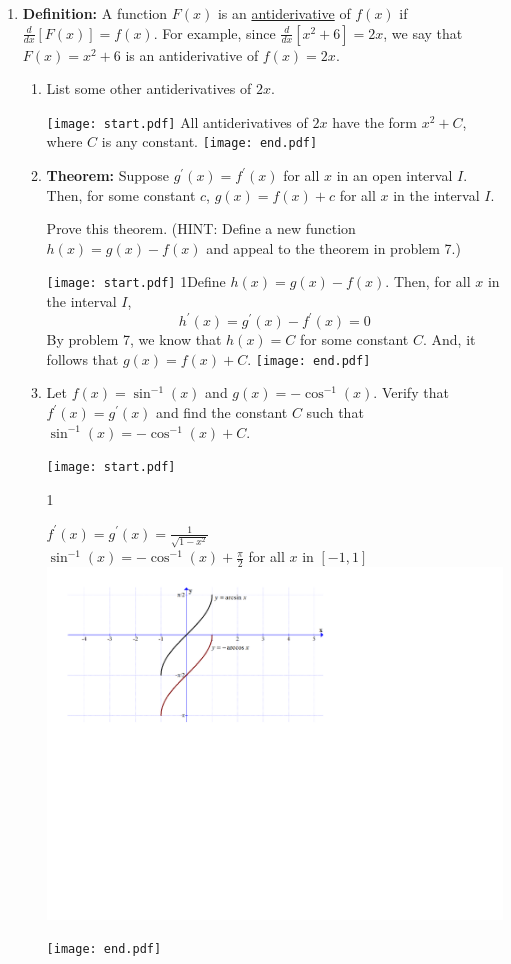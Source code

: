 \documentclass[12pt]{article}
\begin{document}
\begin{enumerate}
\item {\bf Definition:} A function $F(x)$ is an \underline{antiderivative} of $f(x)$ if $\frac{d}{dx}\left[F(x)\right]=f(x)$.  For example, since $\frac{d}{dx}\left[x^2+6\right]=2x$, we say that $F(x)=x^2+6$ is an antiderivative of $f(x)=2x$.

\begin{enumerate}

\item List some other antiderivatives of $2x$.

\texttt{[image: start.pdf]}
{{All antiderivatives of $2x$ have the form $x^2+C$, where $C$ is any constant.}}
\texttt{[image: end.pdf]}


\item {\bf Theorem:} Suppose $g^{\prime}(x)=f^{\prime}(x)$ for all $x$ in an open interval $I$.  Then, for some constant $c$, $g(x)=f(x)+c$ for all $x$ in the interval $I$.

Prove this theorem.  (HINT: Define a new function $h(x)=g(x)-f(x)$ and appeal to the theorem in problem 7.)

\texttt{[image: start.pdf]}
{{{1\linewidth}{Define $h(x)=g(x)-f(x)$.  Then, for all $x$ in the interval $I$,
$$h^{\prime}(x)=g^{\prime}(x)-f^{\prime}(x)=0$$
By problem 7, we know that $h(x)=C$ for some constant $C$. And, it follows that $g(x)=f(x)+C$.
}}}
\texttt{[image: end.pdf]}


\item Let $f(x)=\sin^{-1}(x)$ and $g(x)=-\cos^{-1}(x)$.  Verify that $f^{\prime}(x)=g^{\prime}(x)$ and find the constant $C$ such that $\sin^{-1}(x)=-\cos^{-1}(x)+C$.

\texttt{[image: start.pdf]}
{{{1\linewidth}{\begin{center}$f^{\prime}(x)=g^{\prime}(x)=\frac{1}{\sqrt{1-x^2}}$\\
$\sin^{-1}(x)=-\cos^{-1}(x)+\frac{\pi}{2}$ for all $x$ in $[-1,1]$
\includegraphics[scale=0.5]{antiderivative.pdf}
\end{center}}}}
\texttt{[image: end.pdf]}


\end{enumerate}

\end{enumerate}
\end{document}
